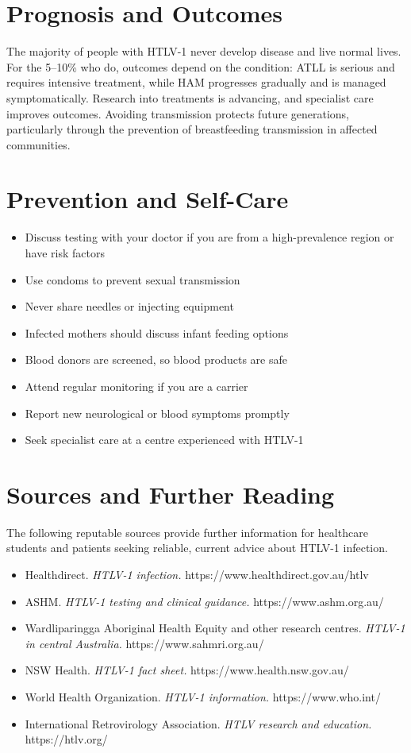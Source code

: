 \section*{Prognosis and Outcomes}
The majority of people with HTLV-1 never develop disease and live normal lives. For the 5--10\% who do, outcomes depend on the condition: ATLL is serious and requires intensive treatment, while HAM progresses gradually and is managed symptomatically. Research into treatments is advancing, and specialist care improves outcomes. Avoiding transmission protects future generations, particularly through the prevention of breastfeeding transmission in affected communities.

\section*{Prevention and Self-Care}
\begin{itemize}
    \item Discuss testing with your doctor if you are from a high-prevalence region or have risk factors
    \item Use condoms to prevent sexual transmission
    \item Never share needles or injecting equipment
    \item Infected mothers should discuss infant feeding options
    \item Blood donors are screened, so blood products are safe
    \item Attend regular monitoring if you are a carrier
    \item Report new neurological or blood symptoms promptly
    \item Seek specialist care at a centre experienced with HTLV-1
\end{itemize}

\section*{Sources and Further Reading}
The following reputable sources provide further information for healthcare students and patients seeking reliable, current advice about HTLV-1 infection.

\begin{itemize}
    \item Healthdirect. \textit{HTLV-1 infection.} https://www.healthdirect.gov.au/htlv
    \item ASHM. \textit{HTLV-1 testing and clinical guidance.} https://www.ashm.org.au/
    \item Wardliparingga Aboriginal Health Equity and other research centres. \textit{HTLV-1 in central Australia.} https://www.sahmri.org.au/
    \item NSW Health. \textit{HTLV-1 fact sheet.} https://www.health.nsw.gov.au/
    \item World Health Organization. \textit{HTLV-1 information.} https://www.who.int/
    \item International Retrovirology Association. \textit{HTLV research and education.} https://htlv.org/
\end{itemize}
